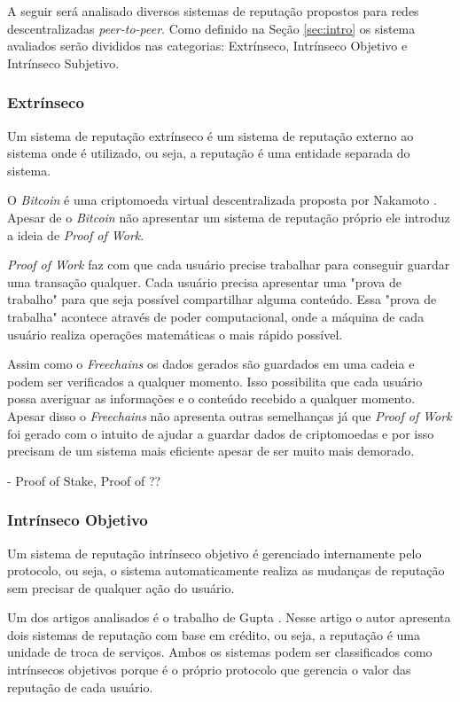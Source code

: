 \documentclass[12pt]{article}
\newcommand{\FC} {\emph{Freechains}\xspace}
\newcommand{\PtoP} {\emph{peer-to-peer}\xspace}
\begin{document}
A seguir será analisado diversos sistemas de reputação propostos para redes descentralizadas \PtoP. Como definido na Seção \ref{sec:intro} os sistema avaliados serão divididos nas categorias: Extrínseco, Intrínseco Objetivo e Intrínseco Subjetivo.

\subsubsection{Extrínseco} \label{subsub:extr}

Um sistema de reputação extrínseco é um sistema de reputação externo ao sistema onde é utilizado, ou seja, a reputação é uma entidade separada do sistema.


O \emph{Bitcoin} é uma criptomoeda virtual descentralizada proposta por Nakamoto \cite{nakamoto2008peer}. Apesar de o \emph{Bitcoin} não apresentar um sistema de reputação próprio ele introduz a ideia de \emph{Proof of Work}. 

\emph{Proof of Work} faz com que cada usuário precise trabalhar para conseguir guardar uma transação qualquer. Cada usuário precisa apresentar uma "prova de trabalho" para que seja possível compartilhar alguma conteúdo. Essa "prova de trabalha" acontece através de poder computacional, onde a máquina de cada usuário realiza operações matemáticas o mais rápido possível.

Assim como o \FC os dados gerados são guardados em uma cadeia e podem ser verificados a qualquer momento. Isso possibilita que cada usuário possa averiguar as informações e o conteúdo recebido a qualquer momento. Apesar disso o \FC não apresenta outras semelhanças já que \emph{Proof of Work} foi gerado com o intuito de ajudar a guardar dados de criptomoedas e por isso precisam de um sistema mais eficiente apesar de ser muito mais demorado.

- Proof of Stake, Proof of ??

\subsubsection{Intrínseco Objetivo} \label{subsub:intobj}

Um sistema de reputação intrínseco objetivo é gerenciado internamente pelo protocolo, ou seja, o sistema automaticamente realiza as mudanças de reputação sem precisar de qualquer ação do usuário. 

Um dos artigos analisados é o trabalho de Gupta \cite{gupta2003reputation}. Nesse artigo o autor apresenta dois  sistemas de reputação com base em crédito, ou seja, a reputação é uma unidade de troca de serviços. Ambos os sistemas podem ser classificados como intrínsecos objetivos porque é o próprio protocolo que gerencia o valor das reputação de cada usuário.
\end{document}
